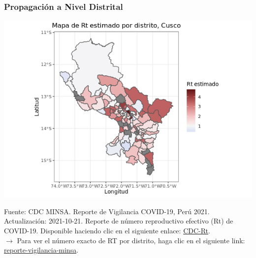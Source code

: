 \documentclass[xcolor=table]{beamer}
\begin{document}
\begin{frame}
	\frametitle{Propagación a Nivel Distrital}
	\vspace{-.5cm}
	\begin{center}
		\includegraphics[width=0.75\linewidth, trim={0cm .5cm 0cm 0.2cm},clip]{../sala_nacional/rt_cusco.png}
	\end{center}
	{\tiny Fuente: CDC MINSA. Reporte de Vigilancia COVID-19, Perú 2021. Actualización: 2021-10-21. Reporte de número reproductivo efectivo (Rt) de COVID-19. Disponible haciendo clic en el siguiente enlace: \href{https://www.dge.gob.pe/portalnuevo/informacion-publica/reporte-de-numero-reproductivo-efectivo-rt/}{CDC-Rt}. \\}
	\vspace{0.01cm}
	$\rightarrow$ Para ver el número exacto de RT por distrito, haga clic en el siguiente link: \href{https://www.dge.gob.pe/portalnuevo/informacion-publica/reporte-de-numero-reproductivo-efectivo-rt/}{\color{mycolor3}reporte-vigilancia-minsa}. \\
\end{frame}
	
\end{document}
